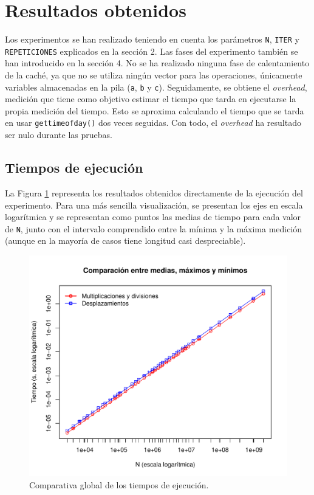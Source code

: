 \documentclass[11pt,a4paper,twoside]{article}
\theoremstyle{definition}
\begin{document}
	\section{Resultados obtenidos}
	
	Los experimentos se han realizado teniendo en cuenta los parámetros \texttt{N}, \texttt{ITER} y \texttt{REPETICIONES} explicados en la sección 2. Las fases del experimento también se han introducido en la sección 4. No se ha realizado ninguna fase de calentamiento de la caché, ya que no se utiliza ningún vector para las operaciones, únicamente variables almacenadas en la pila (\texttt{a}, \texttt{b} y \texttt{c}). Seguidamente, se obtiene el \textit{overhead}, medición que tiene como objetivo estimar el tiempo que tarda en ejecutarse la propia medición del tiempo. Esto se aproxima calculando el tiempo que se tarda en usar \texttt{gettimeofday()} dos veces seguidas. Con todo, el \textit{overhead} ha resultado ser nulo durante las pruebas.
	
	\subsection{Tiempos de ejecución}
	
	La Figura \ref{graf:tiempos} representa los resultados obtenidos directamente de la ejecución del experimento. Para una más sencilla visualización, se presentan los ejes en escala logarítmica y se representan como puntos las medias de tiempo para cada valor de \texttt{N}, junto con el intervalo comprendido entre la mínima y la máxima medición (aunque en la mayoría de casos tiene longitud casi despreciable).
	
	\begin{figure} [H] \centering
		\includegraphics[width=.8\textwidth]{../graficas/NOCHE_tiempos.pdf}
		\caption{Comparativa global de los tiempos de ejecución.}
		\label{graf:tiempos}
	\end{figure}
\end{document}
